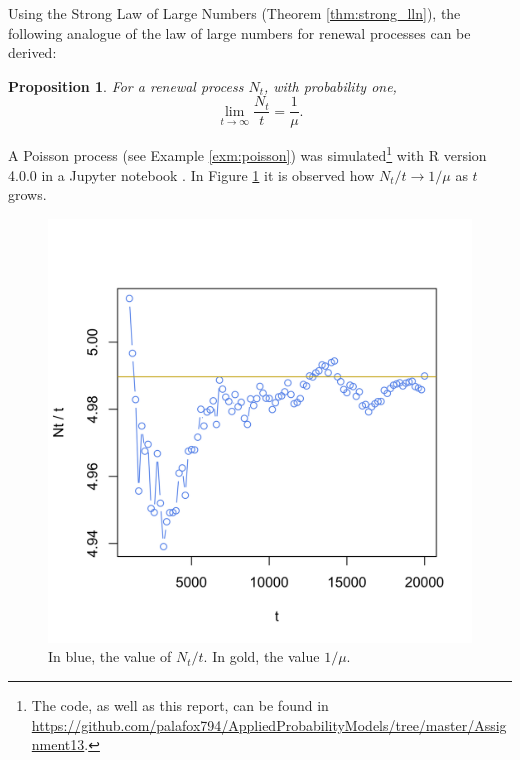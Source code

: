 \documentclass[letterpaper, 10 pt, conference]{article}
\newtheorem{prop}{Proposition}
\begin{document}
Using the Strong Law of Large Numbers (Theorem \ref{thm:strong_lln}), the following analogue of the law of large numbers for renewal processes can be derived:

\begin{prop}
	For a renewal process $N_t$, with probability one,
	\begin{equation}
		\lim_{t \rightarrow \infty} \frac{N_t}{t} = \frac{1}{\mu}.
	\end{equation}
\end{prop}

A Poisson process (see Example \ref{exm:poisson}) was simulated\footnote{The code, as well as this report, can be found in \url{https://github.com/palafox794/AppliedProbabilityModels/tree/master/Assignment13}.} with R version 4.0.0 in a Jupyter notebook \citep{R, jupyter}. In Figure \ref{fig:lln} it is observed how $N_t /t \rightarrow 1/\mu$ as $t$ grows.

\begin{figure}
	\centering
	\includegraphics[width = .5 \linewidth]{lln.png}
	\caption{In blue, the value of $N_t / t$. In gold, the value $1/\mu$.}
	\label{fig:lln}
\end{figure}
\end{document}
